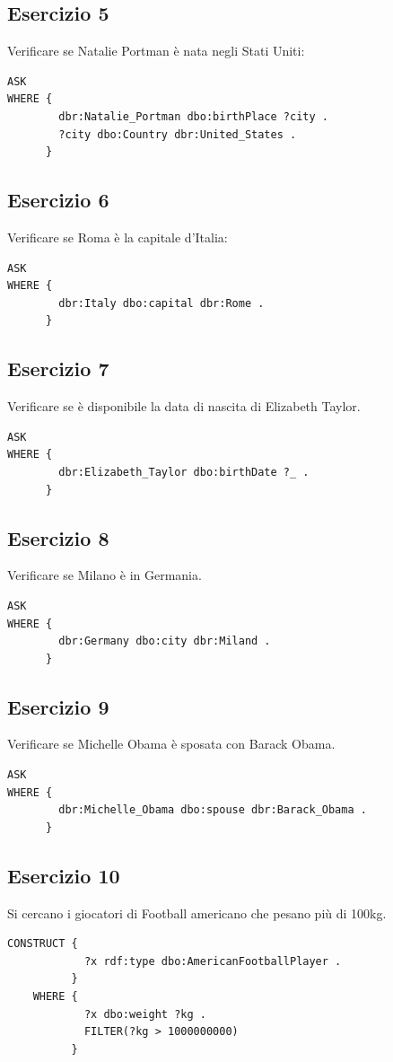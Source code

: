 \documentclass[11pt]{article}
\begin{document}
\subsection*{Esercizio 5}
Verificare se Natalie Portman è nata negli Stati Uniti:
\begin{lstlisting}[language=sparql]
  ASK
WHERE {
        dbr:Natalie_Portman dbo:birthPlace ?city .
        ?city dbo:Country dbr:United_States .
      }
\end{lstlisting}

\subsection*{Esercizio 6}
Verificare se Roma è la capitale d'Italia:
\begin{lstlisting}[language=sparql]
  ASK 
WHERE {
        dbr:Italy dbo:capital dbr:Rome .
      }
\end{lstlisting}

\subsection*{Esercizio 7}
Verificare se è disponibile la data di nascita di Elizabeth Taylor.
\begin{lstlisting}[language=sparql]
  ASK
WHERE {
        dbr:Elizabeth_Taylor dbo:birthDate ?_ .
      }
\end{lstlisting}

\subsection*{Esercizio 8}
Verificare se Milano è in Germania.
\begin{lstlisting}[language=sparql]
  ASK
WHERE {
        dbr:Germany dbo:city dbr:Miland .
      }
\end{lstlisting}

\subsection*{Esercizio 9}
Verificare se Michelle Obama è sposata con Barack Obama.
\begin{lstlisting}[language=sparql]
  ASK
WHERE {
        dbr:Michelle_Obama dbo:spouse dbr:Barack_Obama .
      }
\end{lstlisting}

\subsection*{Esercizio 10}
Si cercano i giocatori di Football americano che pesano più di 100kg.
\begin{lstlisting}[language=sparql]
CONSTRUCT {
            ?x rdf:type dbo:AmericanFootballPlayer .
          }
    WHERE {
            ?x dbo:weight ?kg .
            FILTER(?kg > 1000000000)
          }
\end{lstlisting}
\end{document}
